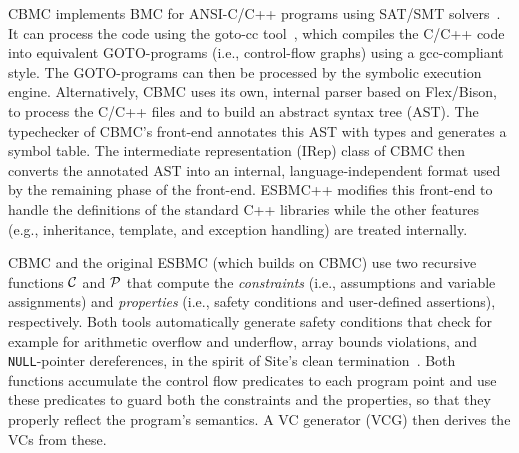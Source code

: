 \documentclass[conference]{IEEEtran}
\begin{document}
\smallskip{}
\label{sec:C-Bounded-Model-Checker}
%
CBMC implements BMC for ANSI-C/C++ programs using SAT/SMT
solvers~\cite{Clarke04}.  It can process %
the code using the goto-cc
tool~\cite{Wintersteiger09}, which compiles the C/C++ code into
equivalent GOTO-programs (i.e., control-flow graphs) using a
gcc-compliant style. The GOTO-programs can then be processed by the
symbolic execution engine. Alternatively, CBMC uses its own, internal
parser based on Flex/Bison, to process the C/C++ files and to build an
abstract syntax tree (AST). The typechecker of CBMC's front-end
annotates this AST with types and generates a symbol table. The intermediate
representation (IRep) class of CBMC then converts the annotated AST into an internal,
language-independent format used by the remaining phase of the
front-end.  ESBMC++ modifies this front-end to handle the definitions of
the standard C++ libraries while the other features (e.g., inheritance,
template, and exception handling) are treated internally.

CBMC and the original ESBMC (which builds on CBMC) use two recursive functions
$\cal C$ and $\cal P$ that compute the \emph{constraints}
(i.e., assumptions and variable assignments) and
\emph{properties} (i.e., safety conditions and user-defined
assertions), respectively. Both tools automatically generate safety conditions
that check for example for arithmetic overflow and underflow, array bounds
violations, and \verb|NULL|-pointer dereferences, in the spirit of Site's clean
termination~\cite{Sites74}. Both functions accumulate the control flow
predicates to each program point and use these predicates to guard both
the constraints and the properties, so that they properly reflect the
program's semantics. A VC generator (VCG) then derives the VCs from
these.
\end{document}
